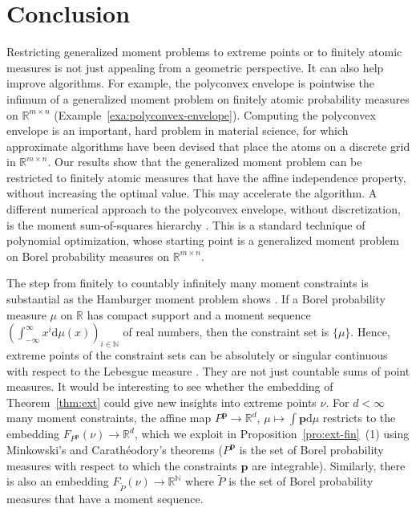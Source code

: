 \documentclass[a4paper,11pt,reqno]{amsart}
\numberwithin{equation}{section}
\theoremstyle{plain}
\theoremstyle{definition}
\newcommand{\bp}{\mathbf{p}}
\newcommand{\dd}{\mathrm{d}} %
\newcommand{\N}{\mathbb{N}} %
\newcommand{\R}{\mathbb{R}} %
\begin{document}
\section{Conclusion}
\label{sec:conclusion}
%
Restricting generalized moment problems to extreme points or to finitely atomic
measures is not just appealing from a geometric perspective. It can also help 
improve algorithms. For example, the polyconvex envelope is pointwise the 
infimum of a generalized moment problem on finitely atomic probability measures on 
$\R^{m\times n}$ (Example~\ref{exa:polyconvex-envelope}). Computing the polyconvex 
envelope is an important, hard problem in material science, for which approximate 
algorithms have been devised \cite{bartels05} that place the atoms on a discrete 
grid in $\R^{m\times n}$. Our results show that the generalized moment problem can 
be restricted to finitely atomic measures that have the affine independence property, 
without increasing the optimal value. This may accelerate the algorithm. A 
different numerical approach to the polyconvex envelope, without discretization, is 
the moment sum-of-squares hierarchy \cite{fantuzzi-etal26}. This is a standard 
technique of polynomial optimization, whose starting point is a generalized moment 
problem on Borel probability measures on $\R^{m\times n}$.
\par
%
The step from finitely to countably infinitely many moment constraints is substantial
as the Hamburger moment problem shows \cite{schmuedgen17}. If a Borel probability 
measure $\mu$ on $\R$ has compact support and a moment sequence 
$(\int_{-\infty}^\infty x^i\dd\mu(x))_{i\in\N}$ of real numbers, then the constraint 
set is $\{\mu\}$. Hence, extreme points of the constraint sets can be absolutely 
or singular continuous with respect to the Lebesgue measure \cite[pp.~22f]{reed-simon80}.
They are not just countable sums of point measures. It would be interesting to see 
whether the embedding of Theorem~\ref{thm:ext} could give new insights into extreme 
points $\nu$. For $d<\infty$ many moment constraints, the affine map $P^\bp\to\R^d$, 
$\mu\mapsto \int\bp\dd\mu$ restricts to the embedding $F_{P^\bp}(\nu)\to\R^d$, which 
we exploit in Proposition~\ref{pro:ext-fin}~(1) using Minkowski's and  
Carath{\'e}odory's theorems ($P^\bp$ is the set of Borel probability measures with respect 
to which the constraints $\bp$ are integrable). Similarly, there is also an embedding 
$F_{\tilde P}(\nu)\to \R^\N$ where $\tilde P$ is the set of Borel probability measures 
that have a moment sequence. 
\par  
\end{document}
